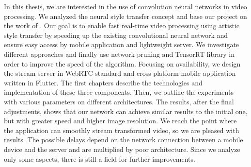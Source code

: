 \documentclass[../Main.tex]{subfiles}
\begin{document}
In this thesis, we are interested in the use of convolution neural networks in video processing. We analyzed the neural style transfer concept and base our project on the work of .
Our goal is to enable fast real-time video processing using artistic style transfer by speeding up the existing convolutional neural network and ensure easy access by mobile application and lightweight server.
We investigate different approaches and finally use network pruning and TensorRT library in order to improve the speed of the algorithm. Focusing on availability, we design the stream server in WebRTC standard and cross-platform mobile application written in Flutter. The first chapters describe the technologies and implementation of these three components. Then, we outline the experiments with various parameters on different architectures. 
The results, after the final adjustments, shows that our network can achieve similar results to the initial one, but with greater speed and higher image resolution. We reach the point where the application can smoothly stream transformed video, so we are pleased with results. The possible delays depend on the network connection between a mobile device and the server and are multiplied by poor architecture. Since we analyze only some aspects, there is still a field for further improvements.

\par\vspace*{\fill} %


\biblio %
\end{document}
